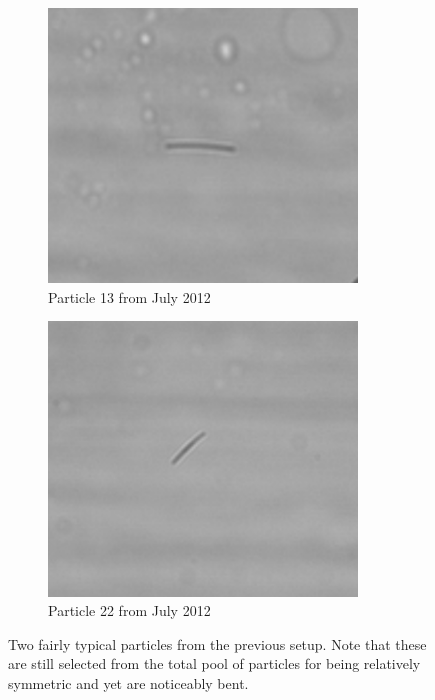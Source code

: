 \label{sec:particle_improves}
\begin{figure}[H]
\centering
\begin{subfigure}[b]{0.45\textwidth}
\includegraphics[width=0.9\textwidth]{figures/improvements/oldparticle2.png}
\caption{Particle 13 from July 2012}
\end{subfigure}
\begin{subfigure}[b]{0.45\textwidth}
\includegraphics[width=0.9\textwidth]{figures/improvements/oldparticle3.png}
\caption{Particle 22 from July 2012}
\end{subfigure}
\caption{Two fairly typical particles from the previous setup. Note that these are still selected from the total pool of particles for being relatively symmetric and yet are noticeably bent.}
\label{fig:oldparticles}
\end{figure}



